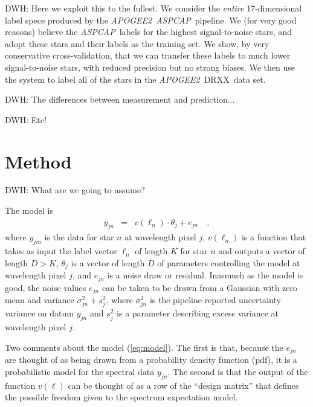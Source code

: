 \documentclass[12pt,preprint]{aastex}
\newcommand{\project}[1]{\textsl{#1}}
\newcommand{\acronym}[1]{{\small{#1}}}
\newcommand{\apogee}{\project{\acronym{APOGEE2}}}
\newcommand{\aspcap}{\project{\acronym{ASPCAP}}}
\newcommand{\dr}{\acronym{DRXX}}
\begin{document}
DWH: Here we exploit this to the fullest.
We consider the \emph{entire} 17-dimensional label spece produced by
the \apogee\ \aspcap\ pipeline.
We (for very good reasons) believe the \aspcap\ labels for the highest
signal-to-noise stars, and adopt these stars and their labels as the
training set.
We show, by very conservative cross-validation, that we can transfer these
labels to much lower signal-to-noise stars, with reduced precision but no
strong biases.
We then use the system to label all of the stars in the \apogee\ \dr\ data set.

DWH: The differences between measurement and prediction...

DWH: Etc!

\section{Method}

DWH: What are we going to assume?

The model is
\begin{eqnarray}
  y_{jn} &=& v(\ell_n)\cdot\theta_j + e_{jn}
  \label{eq:model}\quad ,
\end{eqnarray}
where $y_{jm}$ is the data for star $n$ at wavelength pixel $j$,
$v(\ell_n)$ is a function that takes as input
the label vector $\ell_n$ of length $K$ for star $n$
and outputs a vector of length $D>K$,
$\theta_j$ is a vector of length $D$ of parameters controlling the model at wavelength pixel $j$,
and $e_{jn}$ is a noise draw or residual.
Inasmuch as the model is good, the noise values $e_{jn}$ can be taken to be
drawn from a Gaussian with zero mean and variance $\sigma^2_{jn}+s^2_j$,
where $\sigma^2_{jn}$ is the pipeline-reported uncertainty variance on datum
$y_{jn}$ and $s^2_j$ is a parameter describing excess variance at wavelength pixel $j$.

Two comments about the model (\ref{eq:model}).
The first is that, because the $e_{jn}$ are thought of as being drawn from a 
probability density function (pdf), it is a probabilistic model for the spectral
data $y_{jn}$.
The second is that the output of the function $v(\ell)$ can be thought
of as a row of the ``design matrix'' that defines the possible freedom
given to the spectrum expectation model.
\end{document}
